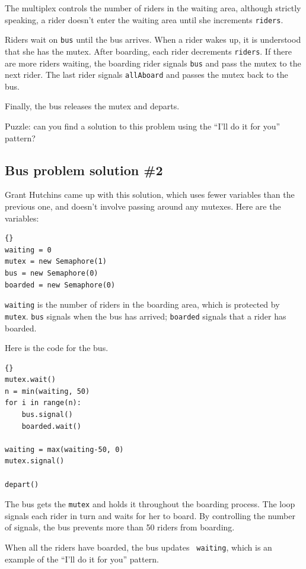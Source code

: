\documentclass{book}
\newcommand{\clearemptydoublepage}{\newpage\cleardoublepage}
\begin{document}
The multiplex controls the number of riders in the waiting area,
although strictly speaking, a rider doesn't enter the waiting
area until she increments {\tt riders}.

Riders wait on {\tt bus} until the bus arrives.  When a rider
wakes up, it is understood that she has the mutex.
After boarding, each rider decrements {\tt riders}.  If there
are more riders waiting, the boarding rider signals {\tt bus}
and pass the mutex to the next rider.  The last rider signals
{\tt allAboard} and passes the mutex back to the bus.

Finally, the bus releases the mutex and departs.

Puzzle: can you find a solution to this problem using the
``I'll do it for you'' pattern?


\clearemptydoublepage
\subsection {Bus problem solution \#2}

Grant Hutchins came up with this solution, which uses fewer
variables than the previous one, and doesn't involve passing
around any mutexes.  Here are the variables:

\begin{lstlisting}[title={Bus problem solution \#2 (initialization)}]{}
waiting = 0
mutex = new Semaphore(1)
bus = new Semaphore(0)
boarded = new Semaphore(0)
\end{lstlisting}

{\tt waiting} is the number of riders in the boarding area,
which is protected by {\tt mutex}.  {\tt bus} signals when the
bus has arrived; {\tt boarded} signals that a rider has boarded.

Here is the code for the bus.

\begin{lstlisting}[title={Bus problem solution (bus)}]{}
mutex.wait()
n = min(waiting, 50)
for i in range(n):
    bus.signal()
    boarded.wait()

waiting = max(waiting-50, 0)
mutex.signal()

depart()
\end{lstlisting}

The bus gets the {\tt mutex} and holds it throughout the boarding
process.  The loop signals each rider in turn and waits for her to
board.  By controlling the number of signals, the bus prevents
more than 50 riders from boarding.

When all the riders have boarded, the bus updates {\tt
waiting}, which is an example of the ``I'll do it for you'' pattern.
\end{document}

